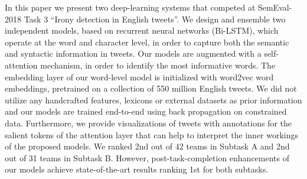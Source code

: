 In this paper we present two deep-learning systems that competed at SemEval-2018 Task 3 ``Irony detection in English tweets''. We design and ensemble two independent models, based on recurrent neural networks (Bi-LSTM), which operate at the word and character level, in order to capture both the semantic and syntactic information in tweets. Our models are augmented with a self-attention mechanism, in order to identify the most informative words. The embedding layer of our word-level model is initialized with word2vec word embeddings, pretrained on a collection of 550 million English tweets. We did not utilize any handcrafted features, lexicons or external datasets as prior information and our models are trained end-to-end using back propagation on constrained data. Furthermore, we provide visualizations of tweets with annotations for the salient tokens of the attention layer that can help to interpret the inner workings of the proposed models. We ranked 2nd out of 42 teams in Subtask A and 2nd out of 31 teams in Subtask B. However, post-task-completion enhancements of our models achieve state-of-the-art results ranking 1st for both subtasks.
